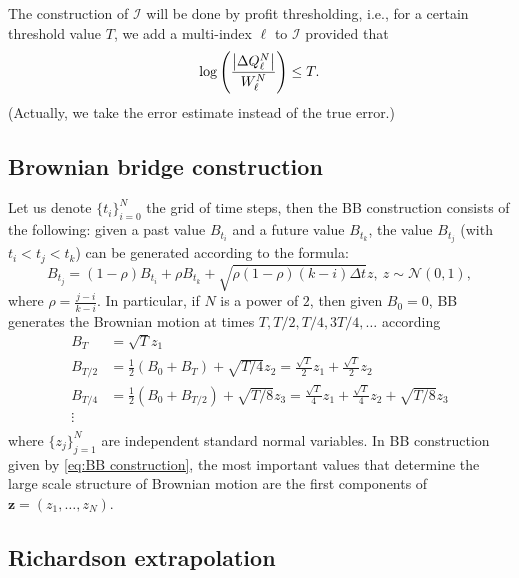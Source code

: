 \documentclass[11pt]{article}
\newcommand{\COMMA}{,}
\begin{document}
The construction of $\mathcal{I}$ will be done by profit thresholding, i.e.,
for a certain threshold value $T$, we add a multi-index $\ell$ to
$\mathcal{I}$ provided that
\begin{equation*}
	\log\left( \frac{\left\lvert\Delta Q^N_\ell\right\rvert}{W_\ell^N} \right) \le T.
\end{equation*}
(Actually, we take the error estimate instead of the true error.)



\subsection{Brownian bridge construction}\label{sec:Brwonian bridge construction}

Let us denote $\{t_i\}_{i=0}^{N}$ the grid of time steps, then the BB construction \cite{glasserman2004monte} consists of the following: given a past value $B_{t_i}$ and a future value $B_{t_k}$, the value $B_{t_j}$ (with $t_i < t_j < t_k$) can be generated according to the formula:
\begin{equation}
B_{t_j}=(1-\rho) B_{t_i}+\rho B_{t_k}+ \sqrt{\rho (1-\rho)(k-i) \Delta t} z, \: z \sim \mathcal{N}(0,1) \COMMA
\end{equation}
where $\rho=\frac{j-i}{k-i}$.  In particular, if $N$ is a power of $2$, then given $B_0=0$, BB generates the Brownian motion at times $T, T/2,T/4,3T/4,\dots$ according
\begin{align}\label{eq:BB construction}
	B_T&=\sqrt{T}z_1\nonumber\\
	B_{T/2}&= \frac{1}{2}(B_{0}+B_{T})+\sqrt{T/4}z_2= \frac{\sqrt{T}}{2} z_1+\frac{\sqrt{T}}{2} z_2\nonumber\\
	B_{T/4}&=\frac{1}{2} (B_{0}+B_{T/2})+\sqrt{T/8}z_3= \frac{\sqrt{T}}{4} z_1+\frac{\sqrt{T}}{4} z_2+\sqrt{T/8}z_3\nonumber\\
	\vdots \nonumber\\
\end{align}
where $\{z_j\}_{j=1}^{N}$ are independent standard normal variables.  In BB construction given by \eqref{eq:BB construction}, the most important values that determine the large scale structure of Brownian motion are the first components of $\mathbf{z} = (z_1,\dots,z_N)$.




\subsection{Richardson extrapolation}\label{sec:Richardson extrapolation}
\end{document}
